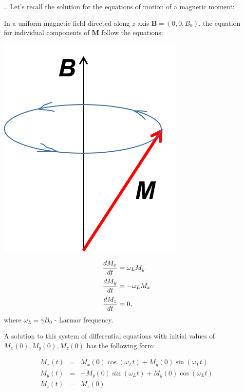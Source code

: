 \documentclass[handout]{beamer}
\begin{document}
\begin{frame}[shrink=5]{\thesection.\thesubsection. \insertsubsection}
	Let's recall the solution for the equations of motion of a magnetic moment:
	
		    In a uniform magnetic field directed along $z$-axis $\bm{B} = (0, 0, B_0)$, the equation for individual components of $\bm{M}$ follow the equations:
		    
		    \begin{minipage}[b][4cm]{0.4\textwidth}
		    	\centering
		    	\includegraphics[width=0.7\textwidth]{figures/precession.png}
		    \end{minipage}
		    \hspace{0.1cm}		    
		    \begin{minipage}[b][4cm]{0.4\textwidth}
		    	\centering
		    	\begin{equation} \label{precession}
		    	\setlength{\jot}{5pt}
		    	\begin{aligned}
		    	\dfrac{dM_x}{dt} & =  \omega_L M_y \\
		    	\dfrac{dM_y}{dt} & =  -\omega_L M_x \\
		    	\dfrac{dM_z}{dt} & =  0,
		    	\end{aligned}
		    	\end{equation}
		    	where $\omega_L = \gamma B_0$ - \alert{Larmor frequency}.
		    \end{minipage}
		    
		    
		    A solution to this system of differential equations with initial values of $M_x(0), M_y(0), M_z(0)$ has the following form:
		    
		    \begin{equation} 
		    \begin{array}{lcl}
		    M_x(t) &=& M_x(0) \cos(\omega_L t) + M_y(0) \sin (\omega_L t) \\
		    M_y(t) &=& -M_y(0) \sin(\omega_L t) + M_y(0) \cos (\omega_L t) \\
		    M_z(t) &=& M_z(0) 
		    \end{array}
		    \end{equation}		

		    	    
\end{frame}
\end{document}
